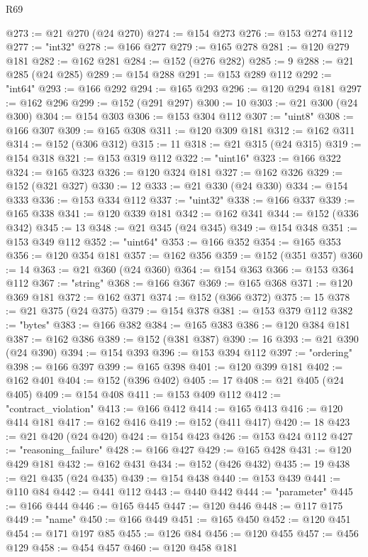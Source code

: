 \begin{lexlean}{R69}
\begin{coremodule}
@273 := @21 @270 (@24 @270)
@274 := @154 @273
@276 := @153 @274 @112
@277 := "int32"
@278 := @166 @277
@279 := @165 @278
@281 := @120 @279 @181
@282 := @162 @281
@284 := @152 (@276 @282)
@285 := 9
@288 := @21 @285 (@24 @285)
@289 := @154 @288
@291 := @153 @289 @112
@292 := "int64"
@293 := @166 @292
@294 := @165 @293
@296 := @120 @294 @181
@297 := @162 @296
@299 := @152 (@291 @297)
@300 := 10
@303 := @21 @300 (@24 @300)
@304 := @154 @303
@306 := @153 @304 @112
@307 := "uint8"
@308 := @166 @307
@309 := @165 @308
@311 := @120 @309 @181
@312 := @162 @311
@314 := @152 (@306 @312)
@315 := 11
@318 := @21 @315 (@24 @315)
@319 := @154 @318
@321 := @153 @319 @112
@322 := "uint16"
@323 := @166 @322
@324 := @165 @323
@326 := @120 @324 @181
@327 := @162 @326
@329 := @152 (@321 @327)
@330 := 12
@333 := @21 @330 (@24 @330)
@334 := @154 @333
@336 := @153 @334 @112
@337 := "uint32"
@338 := @166 @337
@339 := @165 @338
@341 := @120 @339 @181
@342 := @162 @341
@344 := @152 (@336 @342)
@345 := 13
@348 := @21 @345 (@24 @345)
@349 := @154 @348
@351 := @153 @349 @112
@352 := "uint64"
@353 := @166 @352
@354 := @165 @353
@356 := @120 @354 @181
@357 := @162 @356
@359 := @152 (@351 @357)
@360 := 14
@363 := @21 @360 (@24 @360)
@364 := @154 @363
@366 := @153 @364 @112
@367 := "string"
@368 := @166 @367
@369 := @165 @368
@371 := @120 @369 @181
@372 := @162 @371
@374 := @152 (@366 @372)
@375 := 15
@378 := @21 @375 (@24 @375)
@379 := @154 @378
@381 := @153 @379 @112
@382 := "bytes"
@383 := @166 @382
@384 := @165 @383
@386 := @120 @384 @181
@387 := @162 @386
@389 := @152 (@381 @387)
@390 := 16
@393 := @21 @390 (@24 @390)
@394 := @154 @393
@396 := @153 @394 @112
@397 := "ordering"
@398 := @166 @397
@399 := @165 @398
@401 := @120 @399 @181
@402 := @162 @401
@404 := @152 (@396 @402)
@405 := 17
@408 := @21 @405 (@24 @405)
@409 := @154 @408
@411 := @153 @409 @112
@412 := "contract_violation"
@413 := @166 @412
@414 := @165 @413
@416 := @120 @414 @181
@417 := @162 @416
@419 := @152 (@411 @417)
@420 := 18
@423 := @21 @420 (@24 @420)
@424 := @154 @423
@426 := @153 @424 @112
@427 := "reasoning_failure"
@428 := @166 @427
@429 := @165 @428
@431 := @120 @429 @181
@432 := @162 @431
@434 := @152 (@426 @432)
@435 := 19
@438 := @21 @435 (@24 @435)
@439 := @154 @438
@440 := @153 @439
@441 := @110 @84
@442 := @441 @112
@443 := @440 @442
@444 := "parameter"
@445 := @166 @444
@446 := @165 @445
@447 := @120 @446
@448 := @117 @175
@449 := "name"
@450 := @166 @449
@451 := @165 @450
@452 := @120 @451
@454 := @171 @197 @85
@455 := @126 @84
@456 := @120 @455
@457 := @456 @129
@458 := @454 @457
@460 := @120 @458 @181

\end{coremodule}
\end{lexlean}

